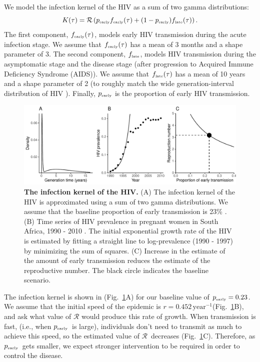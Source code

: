 \documentclass[12pt]{article}
\newcommand{\RR}{\ensuremath{{\mathcal R}}}
\newcommand{\tsub}[2]{#1_{{\textrm{\tiny #2}}}}
\newcommand{\pEarly}{\ensuremath{\tsub{p}{early}}}
\newcommand{\figref}[1]{Fig.~\ref{fig:#1}}
\newcommand{\figlab}[1]{\label{fig:#1}}
\begin{document}
We model the infection kernel of the HIV as a sum of two gamma distributions:
\begin{equation}
K(\tau) = \mathcal R \left(\tsub{p}{early} \tsub{f}{early}(\tau) + (1-\tsub{p}{early}) \tsub{f}{late}(\tau) \right).
\end{equation}
The first component, $\tsub{f}{early}(\tau)$, models early HIV transmission during the acute infection stage.
We assume that $\tsub{f}{early}(\tau)$ has a mean of 3 months \citep{hollingsworth2008hiv} and a shape parameter of 3.
The second component, $\tsub{f}{late}$, models HIV transmission during the asymptomatic stage and the disease stage (after progression to Acquired Immune Deficiency Syndrome (AIDS)).
We assume that $\tsub{f}{late}(\tau)$ has a mean of 10 years \citep{brookmeyer1989censoring, nishiura2019estimating} and a shape parameter of 2 (to roughly match the wide generation-interval distribution of HIV \citep{fraser2004factors}).
Finally, $\tsub{p}{early}$ is the proportion of early HIV transmission.

\begin{figure}[!th]
\includegraphics[width=\textwidth]{../figure/HIV.pdf}
\caption{
\textbf{The infection kernel of the HIV.}
(A) The infection kernel of the HIV is approximated using a sum of two gamma distributions. We assume that the baseline proportion of early transmission is 23\% \citep{hayes2006amplified}.
(B) Time series of HIV prevalence in pregnant women in South Africa, 1990 - 2010 \citep{barron2013eliminating}. The initial exponential growth rate of the HIV is estimated by fitting a straight line to log-prevalence (1990 - 1997) by minimizing the sum of squares.
(C) Increase in the estimate of the amount of early transmission reduces the estimate of the reproductive number.
The black circle indicates the baseline scenario.
}
\figlab{example}
\end{figure}

The infection kernel is shown in (\figref{example}A) for our baseline value of  
$\tsub{p}{early} = 0.23$. We assume that the initial speed of the epidemic is $r=0.452\,\mathrm{year}^{-1}$(\figref{example}B), and ask what value of $\RR$ would produce this rate of growth.
When transmission is fast, (i.e., when \pEarly\ is large), individuals don't need to transmit as much to achieve this speed, so the estimated value of \RR\ decreases (\figref{example}C).
Therefore, as \pEarly\ gets smaller, we expect stronger intervention to be required in order to control the disease.
\end{document}
